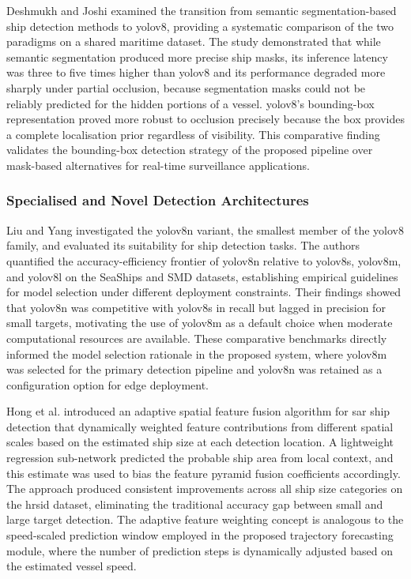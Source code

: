 Deshmukh and Joshi \cite{Deshmukh2025} examined the transition from semantic
segmentation-based ship detection methods to \gls{yolov8}, providing a systematic
comparison of the two paradigms on a shared maritime dataset. The study
demonstrated that while semantic segmentation produced more precise ship masks,
its inference latency was three to five times higher than \gls{yolov8} and its
performance degraded more sharply under partial occlusion, because segmentation
masks could not be reliably predicted for the hidden portions of a vessel.
\gls{yolov8}'s bounding-box representation proved more robust to occlusion precisely
because the box provides a complete localisation prior regardless of visibility.
This comparative finding validates the bounding-box detection strategy of the
proposed pipeline over mask-based alternatives for real-time surveillance
applications.
 
\subsubsection{\textbf{Specialised and Novel Detection Architectures}}
 
Liu and Yang \cite{Liu2025b} investigated the \gls{yolov8}n variant, the smallest
member of the \gls{yolov8} family, and evaluated its suitability for ship detection
tasks. The authors quantified the accuracy-efficiency frontier of \gls{yolov8}n
relative to \gls{yolov8}s, \gls{yolov8}m, and \gls{yolov8}l on the SeaShips and SMD datasets,
establishing empirical guidelines for model selection under different deployment
constraints. Their findings showed that \gls{yolov8}n was competitive with \gls{yolov8}s
in recall but lagged in precision for small targets, motivating the use of
\gls{yolov8}m as a default choice when moderate computational resources are available.
These comparative benchmarks directly informed the model selection rationale
in the proposed system, where \gls{yolov8}m was selected for the primary detection
pipeline and \gls{yolov8}n was retained as a configuration option for edge deployment.
 
Hong et al. \cite{Hong2024} introduced an adaptive spatial feature fusion
algorithm for \gls{sar} ship detection that dynamically weighted feature contributions
from different spatial scales based on the estimated ship size at each detection
location. A lightweight regression sub-network predicted the probable ship area
from local context, and this estimate was used to bias the feature pyramid fusion
coefficients accordingly. The approach produced consistent improvements across all
ship size categories on the \gls{hrsid} dataset, eliminating the traditional accuracy
gap between small and large target detection. The adaptive feature weighting
concept is analogous to the speed-scaled prediction window employed in the
proposed trajectory forecasting module, where the number of prediction steps
is dynamically adjusted based on the estimated vessel speed.
 
